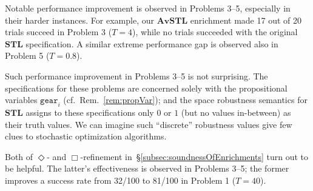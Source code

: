 \documentclass[envcountsect,orivec]{llncs} \usepackage{etex} \usepackage[]{graphicx}
\newcommand{\STL}{\textbf{STL}}
\newcommand{\AvSTL}{\textbf{AvSTL}}
\begin{document}
 Notable performance improvement is observed in Problems 3--5, 
especially in their harder instances. For
example, our $\AvSTL$ enrichment made 17 out of 20 trials succeed in
Problem 3 ($T=4$), while no trials succeeded with the original $\STL$
specification. A similar extreme performance gap is observed also in
Problem 5 ($T=0.8$).

Such performance improvement in Problems 3--5  is not surprising. The
specifications for these problems
are concerned solely with the propositional variables
$\mathtt{gear}_{i}$ (cf.\ Rem.~\ref{rem:propVar});
and the space
robustness semantics for $\STL$ assigns to these specifications only $0$
or $1$
(but no values in-between) as their
truth 
values. We can imagine such ``discrete'' robustness values give few clues
to stochastic optimization algorithms.

Both of 
 $\Diamond$- and
       $\Box$-refinement
 in~\S{}\ref{subsec:soundnessOfEnrichments}
turn out to be helpful. The latter's effectiveness is observed in
Problems 3--5; the former improves a success rate from 32/100 to 81/100
in Problem 1 ($T=40$). 
\end{document}
